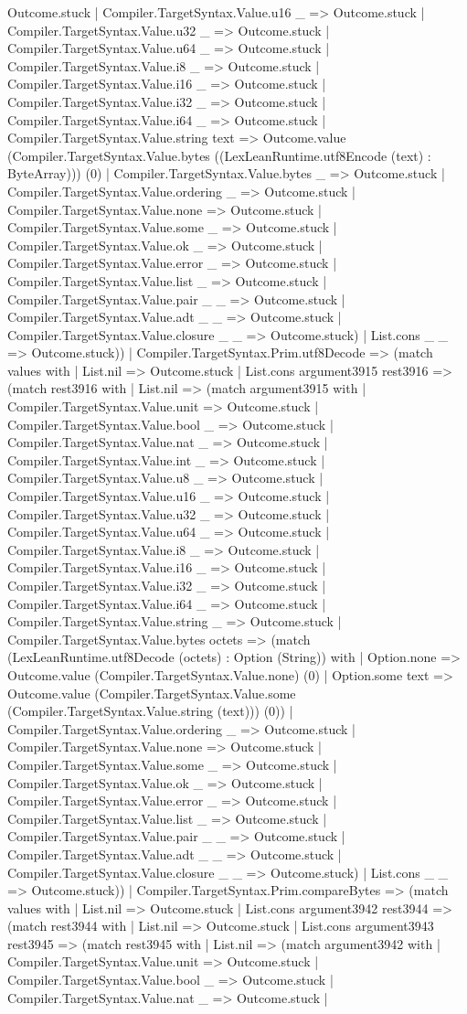 \documentclass[11pt]{article}
\begin{document}
Outcome.stuck | Compiler.TargetSyntax.Value.u16 \_ => Outcome.stuck | Compiler.TargetSyntax.Value.u32 \_ => Outcome.stuck | Compiler.TargetSyntax.Value.u64 \_ => Outcome.stuck | Compiler.TargetSyntax.Value.i8 \_ => Outcome.stuck | Compiler.TargetSyntax.Value.i16 \_ => Outcome.stuck | Compiler.TargetSyntax.Value.i32 \_ => Outcome.stuck | Compiler.TargetSyntax.Value.i64 \_ => Outcome.stuck | Compiler.TargetSyntax.Value.string text => Outcome.value (Compiler.TargetSyntax.Value.bytes ((LexLeanRuntime.utf8Encode (text) : ByteArray))) (0) | Compiler.TargetSyntax.Value.bytes \_ => Outcome.stuck | Compiler.TargetSyntax.Value.ordering \_ => Outcome.stuck | Compiler.TargetSyntax.Value.none => Outcome.stuck | Compiler.TargetSyntax.Value.some \_ => Outcome.stuck | Compiler.TargetSyntax.Value.ok \_ => Outcome.stuck | Compiler.TargetSyntax.Value.error \_ => Outcome.stuck | Compiler.TargetSyntax.Value.list \_ => Outcome.stuck | Compiler.TargetSyntax.Value.pair \_ \_ => Outcome.stuck | Compiler.TargetSyntax.Value.adt \_ \_ => Outcome.stuck | Compiler.TargetSyntax.Value.closure \_ \_ => Outcome.stuck) | List.cons \_ \_ => Outcome.stuck)) | Compiler.TargetSyntax.Prim.utf8Decode => (match values with | List.nil => Outcome.stuck | List.cons argument3915 rest3916 => (match rest3916 with | List.nil => (match argument3915 with | Compiler.TargetSyntax.Value.unit => Outcome.stuck | Compiler.TargetSyntax.Value.bool \_ => Outcome.stuck | Compiler.TargetSyntax.Value.nat \_ => Outcome.stuck | Compiler.TargetSyntax.Value.int \_ => Outcome.stuck | Compiler.TargetSyntax.Value.u8 \_ => Outcome.stuck | Compiler.TargetSyntax.Value.u16 \_ => Outcome.stuck | Compiler.TargetSyntax.Value.u32 \_ => Outcome.stuck | Compiler.TargetSyntax.Value.u64 \_ => Outcome.stuck | Compiler.TargetSyntax.Value.i8 \_ => Outcome.stuck | Compiler.TargetSyntax.Value.i16 \_ => Outcome.stuck | Compiler.TargetSyntax.Value.i32 \_ => Outcome.stuck | Compiler.TargetSyntax.Value.i64 \_ => Outcome.stuck | Compiler.TargetSyntax.Value.string \_ => Outcome.stuck | Compiler.TargetSyntax.Value.bytes octets => (match (LexLeanRuntime.utf8Decode (octets) : Option (String)) with | Option.none => Outcome.value (Compiler.TargetSyntax.Value.none) (0) | Option.some text => Outcome.value (Compiler.TargetSyntax.Value.some (Compiler.TargetSyntax.Value.string (text))) (0)) | Compiler.TargetSyntax.Value.ordering \_ => Outcome.stuck | Compiler.TargetSyntax.Value.none => Outcome.stuck | Compiler.TargetSyntax.Value.some \_ => Outcome.stuck | Compiler.TargetSyntax.Value.ok \_ => Outcome.stuck | Compiler.TargetSyntax.Value.error \_ => Outcome.stuck | Compiler.TargetSyntax.Value.list \_ => Outcome.stuck | Compiler.TargetSyntax.Value.pair \_ \_ => Outcome.stuck | Compiler.TargetSyntax.Value.adt \_ \_ => Outcome.stuck | Compiler.TargetSyntax.Value.closure \_ \_ => Outcome.stuck) | List.cons \_ \_ => Outcome.stuck)) | Compiler.TargetSyntax.Prim.compareBytes => (match values with | List.nil => Outcome.stuck | List.cons argument3942 rest3944 => (match rest3944 with | List.nil => Outcome.stuck | List.cons argument3943 rest3945 => (match rest3945 with | List.nil => (match argument3942 with | Compiler.TargetSyntax.Value.unit => Outcome.stuck | Compiler.TargetSyntax.Value.bool \_ => Outcome.stuck | Compiler.TargetSyntax.Value.nat \_ => Outcome.stuck | 
\end{document}
